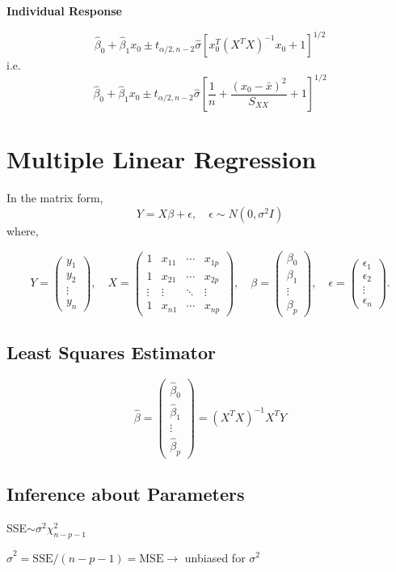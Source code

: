 \documentclass[11pt,a4paper]{article}
\begin{document}
\textbf{Individual Response} \par
\[
\hat{\beta}_0 + \hat{\beta}_1 x_0 \pm t_{\alpha/2, n-2} \hat{\sigma} \left[x_0^T (X^TX)^{-1} x_0 + 1\right]^{1/2}
\]
i.e.
\[
\hat{\beta}_0 + \hat{\beta}_1 x_0 \pm t_{\alpha/2, n-2} \hat{\sigma} \left[\frac{1}{n} + \frac{(x_0 - \bar{x})^2}{S_{XX}} + 1\right]^{1/2}
\]

\section{Multiple Linear Regression}
In the matrix form, 
\[
Y = X \beta + \epsilon, \quad \epsilon \sim N(0, \sigma^2 I)
\]
where,

\[
Y=
\begin{pmatrix}
y_1\\
y_2\\
\vdots\\
y_n
\end{pmatrix},
\quad
X=
\begin{pmatrix}
1 & x_{11} & \cdots & x_{1p}\\
1 & x_{21} & \cdots & x_{2p}\\
\vdots & \vdots & \ddots & \vdots\\
1 & x_{n1} & \cdots & x_{np}
\end{pmatrix},
\quad
\beta=
\begin{pmatrix}
\beta_0\\
\beta_1\\
\vdots\\
\beta_p
\end{pmatrix},
\quad
\epsilon=
\begin{pmatrix}
\epsilon_1\\
\epsilon_2\\
\vdots\\
\epsilon_n
\end{pmatrix}.
\]

\subsection{Least Squares Estimator}
\[
\hat{\beta} = 
\begin{pmatrix}
\hat{\beta}_0 \\
\hat{\beta}_1 \\
\vdots \\
\hat{\beta}_p
\end{pmatrix}
= (X^T X)^{-1} X^T Y
\]

\subsection{Inference about Parameters}
SSE$\sim \sigma^2 \chi^2_{n-p-1}$ \par
$\hat{\sigma}^2 = \text{SSE} / (n - p - 1) = \text{MSE} \rightarrow$ unbiased for $\sigma^2$
\end{document}
